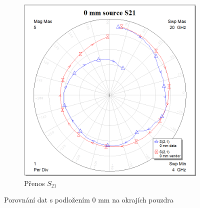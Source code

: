 \documentclass[11pt,a4paper]{article}
\begin{document}
\begin{figure}[!ht]
\begin{subfigure}{0.45\textwidth}
    \includegraphics[width=\textwidth]{src/0mm-S21.png}
    \caption{Přenos $S_{21}$}
\end{subfigure}
\caption{\label{fig:0mm}Porovnání dat s podložením 0 mm na okrajích pouzdra}
\end{figure}
\end{document}
